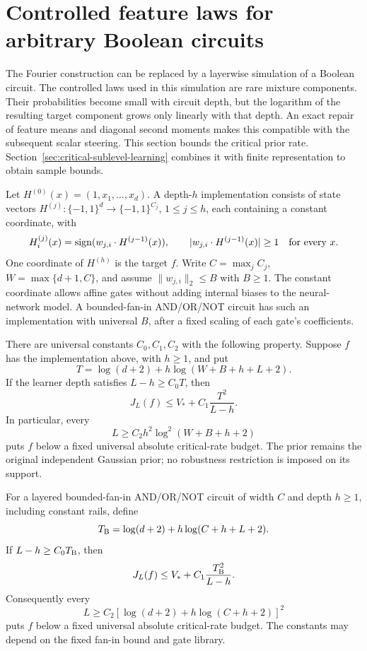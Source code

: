 \section{Controlled feature laws for arbitrary Boolean circuits}
\label{sec:controlled-circuit-rates}

The Fourier construction can be replaced by a layerwise simulation of a
Boolean circuit. The controlled laws used in this simulation are rare
mixture components. Their probabilities become small with circuit depth,
but the logarithm of the resulting target component grows only linearly
with that depth. An exact repair of feature means and diagonal second
moments makes this compatible with the subsequent scalar steering.
This section bounds the critical prior rate. Section~\ref{sec:critical-sublevel-learning}
combines it with finite representation to obtain sample bounds.

\begin{definition}
Let $H^{(0)}(x)=(1,x_1,\ldots,x_d)$. A depth-$h$ implementation consists
of state vectors $H^{(j)}:\{-1,1\}^d\to\{-1,1\}^{C_j}$,
$1\le j\le h$, each containing a constant coordinate, with
\[
 H^{(j)}_i(x)=\operatorname{sign}(w_{j,i}\cdot H^{(j-1)}(x)),
 \qquad
 |w_{j,i}\cdot H^{(j-1)}(x)|\ge1
 \quad\hbox{for every }x.
\]
One coordinate of $H^{(h)}$ is the target $f$.
Write $C=\max_j C_j$, $W=\max\{d+1,C\}$, and assume
$\|w_{j,i}\|_2\le B$ with $B\ge1$.
The constant coordinate allows affine gates without adding internal
biases to the neural-network model. A bounded-fan-in AND/OR/NOT circuit
has such an implementation with universal $B$, after a fixed scaling
of each gate's coefficients.
\end{definition}

\begin{theorem}
\label{thm:controlled-circuit-rate}
There are universal constants $C_0,C_1,C_2$ with the following property.
Suppose $f$ has the implementation above, with $h\ge1$, and put
\[
 T=\log(d+2)+h\log(W+B+h+L+2).
\]
If the learner depth satisfies $L-h\ge C_0T$, then
\[
 J_L(f)\le V_*+C_1\frac{T^2}{L-h}.
\]
In particular, every
\[
 L\ge C_2 h^2\log^2(W+B+h+2)
\]
puts $f$ below a fixed universal absolute critical-rate budget.
The prior remains the original independent Gaussian prior; no
robustness restriction is imposed on its support.
\end{theorem}

\begin{corollary}
\label{cor:controlled-boolean-circuit-rate}
For a layered bounded-fan-in AND/OR/NOT circuit of width $C$ and depth
$h\ge1$, including constant rails, define
\[
 T_{\rm B}=\log(d+2)+h\log(C+h+L+2).
\]
If $L-h\ge C_0T_{\rm B}$, then
\[
 J_L(f)\le V_*+C_1\frac{T_{\rm B}^2}{L-h}.
\]
Consequently every
\[
 L\ge C_2[\log(d+2)+h\log(C+h+2)]^2
\]
puts $f$ below a fixed universal absolute critical-rate budget.
The constants may depend on the fixed fan-in bound and gate library.
\end{corollary}

